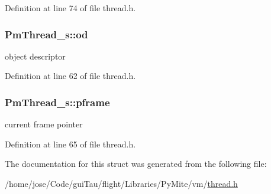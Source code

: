 Definition at line 74 of file thread.\-h.

\hypertarget{struct_pm_thread__s_aa652f4d964a2dedac2c11b67afe9a951}{
\subsubsection[{od}]{ Pm\-Thread\-\_\-s\-::od}}\label{struct_pm_thread__s_aa652f4d964a2dedac2c11b67afe9a951}
object descriptor 

Definition at line 62 of file thread.\-h.

\hypertarget{struct_pm_thread__s_ad21102bd82c351326781978540fdf4e0}{
\subsubsection[{pframe}]{ Pm\-Thread\-\_\-s\-::pframe}}\label{struct_pm_thread__s_ad21102bd82c351326781978540fdf4e0}
current frame pointer 

Definition at line 65 of file thread.\-h.



The documentation for this struct was generated from the following file\-:\begin{DoxyCompactItemize}
\item 
/home/jose/\-Code/gui\-Tau/flight/\-Libraries/\-Py\-Mite/vm/\hyperlink{thread_8h}{thread.\-h}\end{DoxyCompactItemize}
